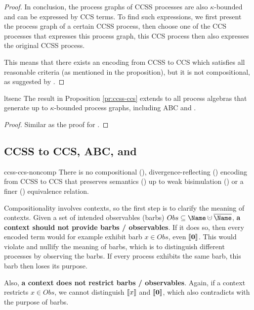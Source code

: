 \documentclass[adraft,hidelinks]{eptcs}
\begin{document}
\begin{proof}
  In conclusion, the process graphs of CCSS processes are also $\kappa$-bounded and can be expressed by CCS terms.
  To find such expressions, we first present the process graph of a certain CCSS process, then choose one of the CCS processes that expresses this process graph, this CCS process then also expresses the original CCSS process.

  This means that there exists an encoding from CCSS to CCS which satisfies all reasonable criteria (as mentioned in the proposition), but it is not compositional, as suggested by .
\end{proof}

\begin{proposition}{ltsenc}
  The result in Proposition \ref{pr:ccss-ccs} extends to all process algebras that generate up to $\kappa$-bounded process graphs, including ABC and \CSG.
\end{proposition}

\begin{proof}
  Similar as the proof for .
\end{proof}

\subsection{CCSS to CCS, ABC, and \CSG}
\label{sec:ccss-ccs}

\begin{proposition}{ccss-ccs-noncomp}
  There is no compositional (), divergence-reflecting () encoding from CCSS to CCS that preserves semantics () up to weak bisimulation () or a finer () equivalence relation.
\end{proposition}

Compositionality involves contexts, so the first step is to clarify the meaning of contexts.
Given a set of intended observables (barbs) $Obs\subseteq \Name\dcup\overline{\Name}$, \textbf{a context should not provide barbs / observables}.
If it does so, then every encoded term would for example exhibit barb $x\in Obs$, even $\bkt\nil$.
This would violate and nullify the meaning of barbs, which is to distinguish different processes by observing the barbs.
If every process exhibits the same barb, this barb then loses its purpose.

Also, \textbf{a context does not restrict barbs / observables}.
Again, if a context restricts $x\in Obs$, we cannot distinguish $\bkt{x}$ and $\bkt{\nil}$, which also contradicts with the purpose of barbs.
\end{document}
